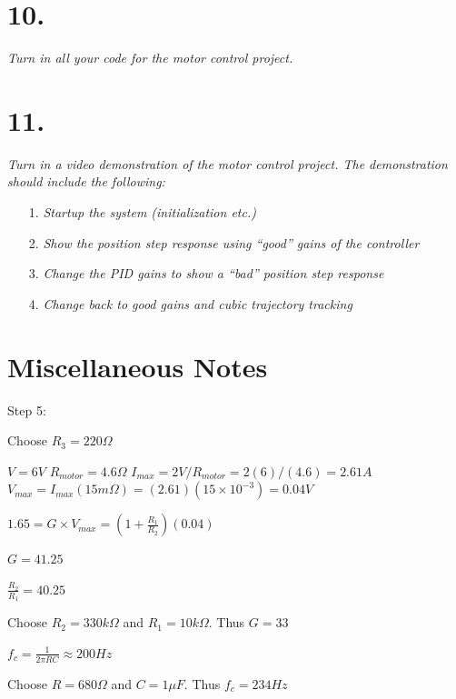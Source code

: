 \documentclass[12pt]{article}
\begin{document}
\section*{10.}
\textit{Turn in all your code for the motor control project.}

\section*{11.}
\textit{Turn in a video demonstration of the motor control project.  The demonstration should include the following:}
\begin{enumerate}
    \item[1.]
    \textit{Startup the system (initialization etc.)}

    \item[2.]
    \textit{Show the position step response using “good” gains of the controller}

    \item[3.]
    \textit{Change the PID gains to show a “bad” position step response}

    \item[4.]
    \textit{Change back to good gains and cubic trajectory tracking}
\end{enumerate}


\section*{Miscellaneous Notes}
Step 5:

Choose $R_3 = 220 \Omega$

$V = 6V$ %
$R_{motor} = 4.6 \Omega$
$I_{max} = 2V/R_{motor} = 2(6)/(4.6) = 2.61A$ %
$V_{max} = I_{max} (15 m\Omega) = (2.61) (15 \times 10^{-3}) = 0.04 V$

$1.65 = G \times V_{max} = (1+\frac{R_1}{R_2}) (0.04)$

$G = 41.25$

$\frac{R_2}{R_1} = 40.25$

Choose $R_2 = 330 k\Omega$ and $R_1 = 10 k\Omega$.
Thus $G = 33$

$f_c = \frac{1}{2 \pi RC} \approx 200 Hz$

Choose $R = 680 \Omega$ and $C = 1 \mu F$.
Thus $f_c = 234 Hz$
\end{document}
